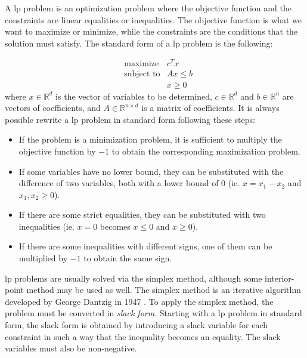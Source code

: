 A \gls{lp} problem is an optimization problem where the objective function and the constraints are linear equalities or inequalities.
The objective function is what we want to maximize or minimize, while the constraints are the conditions that the solution must satisfy.
The standard form of a \gls{lp} problem is the following:

\begin{equation*}
    \begin{aligned}
         & \text{maximize}   & c^T x      \\
         & \text{subject to} & A x \leq b \\
         &                   & x \geq 0
    \end{aligned}
\end{equation*}
where $x \in \mathbb{R}^d$ is the vector of variables to be determined, $c \in \mathbb{R}^d$ and $b \in \mathbb{R}^n$ are vectors of coefficients, and $A \in \mathbb{R}^{n \times d}$ is a matrix of coefficients.
It is always possible rewrite a \gls{lp} problem in standard form following these steps:
\begin{itemize}
    \item If the problem is a minimization problem, it is sufficient to multiply the objective function by $-1$ to obtain the corresponding maximization problem.
    \item If some variables have no lower bound, they can be substituted with the difference of two variables, both with a lower bound of $0$ (ie. $x = x_1 - x_2$ and $x_1, x_2 \geq 0$).
    \item If there are some strict equalities, they can be substituted with two inequalities (ie. $x = 0$ becomes $x \leq 0$ and $x \geq 0$).
    \item If there are some inequalities with different signs, one of them can be multiplied by $-1$ to obtain the same sign.
\end{itemize}

\gls{lp} problems are usually solved via the simplex method, although some interior-point method \cite{paper:interior-point} may be used as well.
The simplex method is an iterative algorithm developed by George Dantzig in 1947 \cite{paper:simplex}.
To apply the simplex method, the problem must be converted in \textit{slack form}.
Starting with a \gls{lp} problem in standard form, the slack form is obtained by introducing a slack variable for each constraint in such a way that the inequality becomes an equality.
The slack variables must also be non-negative.

